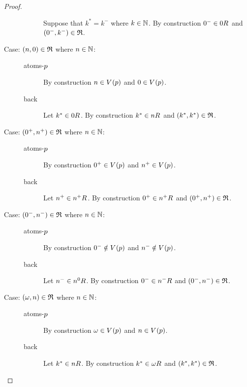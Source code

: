 \begin{proof}
\begin{description}
\begin{description}
                Suppose that $k^* = k^-$ where $k \in \mathbb{N}$.
                By construction $0^- \in \kSuccessors{}{0}$ and $(0^-, k^-) \in \mathfrak{R}$.
        \end{description}
    \item[Case: $(n, 0) \in \mathfrak{R}$ where $n \in \mathbb{N}$:]\hfill
        \begin{description}
            \item[atoms-$p$]
                By construction $n \in \kValuation(\atomP)$ and $0 \in \kValuation(\atomP)$.
            \item[back]
                Let $k^* \in \kSuccessors{}{0}$.
                By construction $k^* \in \kSuccessors{}{n}$ and $(k^*, k^*) \in \mathfrak{R}$.
        \end{description}
    \item[Case: $(0^+, n^+) \in \mathfrak{R}$ where $n \in \mathbb{N}$:]\hfill
        \begin{description}
            \item[atoms-$p$]
                By construction $0^+ \in \kValuation(\atomP)$ and $n^+ \in \kValuation(\atomP)$.
            \item[back]
                Let $n^+ \in \kSuccessors{}{n^+}$.
                By construction $0^+ \in \kSuccessors{}{n^+}$ and $(0^+, n^+) \in \mathfrak{R}$.
        \end{description}
    \item[Case: $(0^-, n^-) \in \mathfrak{R}$ where $n \in \mathbb{N}$:]\hfill
        \begin{description}
            \item[atoms-$p$]
                By construction $0^- \notin \kValuation(\atomP)$ and $n^- \notin \kValuation(\atomP)$.
            \item[back]
                Let $n^- \in \kSuccessors{}{n^0}$.
                By construction $0^- \in \kSuccessors{}{n^-}$ and $(0^-, n^-) \in \mathfrak{R}$.
        \end{description}
    \item[Case: $(\omega, n) \in \mathfrak{R}$ where $n \in \mathbb{N}$:]\hfill
        \begin{description}
            \item[atoms-$p$]
                By construction $\omega \in \kValuation(\atomP)$ and $n \in \kValuation(\atomP)$.
            \item[back]
                Let $k^* \in \kSuccessors{}{n}$.
                By construction $k^* \in \kSuccessors{}{\omega}$ and $(k^*, k^*) \in \mathfrak{R}$.

\end{description}
\end{description}
\end{proof}
